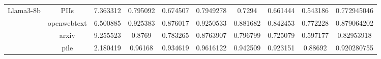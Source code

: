 \begin{table*}[ht]
{\begin{tabular}{ccc|ccc|ccc|c}
\multirow{4}{*}{Llama3-8b}    & PIIs                     & 7.363312             & 0.795092 & 0.674507 & 0.7949278 & 0.7294   & 0.661444 & 0.543186 & 0.772945046          \\
                              & openwebtext              & 6.500885             & 0.925383 & 0.876017 & 0.9250533 & 0.881682 & 0.842453 & 0.772228 & 0.879064202          \\
                              & arxiv                    & 9.255523             & 0.8769   & 0.783265 & 0.8763907 & 0.796799 & 0.725079 & 0.597177 & 0.82953918           \\
                              & pile                     & 2.180419             & 0.96168  & 0.934619 & 0.9616122 & 0.942509 & 0.923151 & 0.88692  & 0.920280755          \\ \bottomrule[1.5pt]
\end{tabular}
}
\end{table*}